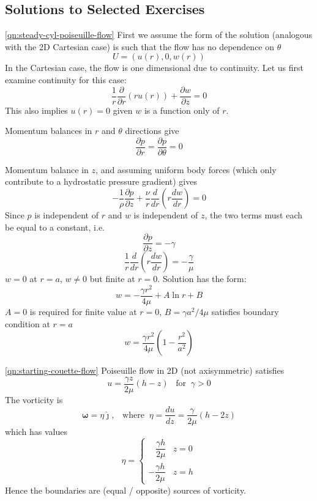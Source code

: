 \documentclass[10pt]{report}
\begin{document}
\begin{answer5}
\newpage
\section{Solutions to Selected Exercises}

\begin{questionnumber}{\ref{qn:steady-cyl-poiseuille-flow}}
	First we assume the form of the solution (analogous with the 2D Cartesian case) is such that the flow has no dependence on $\theta$
	\[
		U = \left( u(r), 0, w(r) \right)
	\]
	In the Cartesian case, the flow is one dimensional due to continuity. Let us first examine
	continuity for this case:
	\[
		\frac{1}{r}\frac{\partial }{\partial r} (r u(r)) + \frac{\partial w}{\partial z} = 0
	\]
	This also implies $u(r) = 0$ given $w$ is a function only of $r$.

	Momentum balances in $r$ and $\theta$ directions give
	\[
		\frac{\partial p}{\partial r} = \frac{\partial p}{\partial \theta} = 0
	\]

	Momentum balance in $z$, and assuming uniform body forces (which only contribute to a hydrostatic pressure gradient) gives
	\[
		-\frac{1}{\rho}\frac{\partial p}{\partial z} +
		\frac{\nu}{r} \frac{d}{dr}\left(r\frac{dw}{dr}\right) = 0
	\]
	Since $p$ is independent of $r$ and $w$ is independent of $z$, the two
	terms must each be equal to a constant, i.e.
	\[
		\frac{\partial p}{\partial z} = -\gamma
	\]
	\[
		\frac{1}{r} \frac{d}{dr}\left(r\frac{dw}{dr}\right) = -\frac{\gamma}{\mu}
	\]
	$w=0$ at $r=a$, $w\ne 0$ but finite at $r=0$. Solution has the form:
	\[
		w = -\frac{\gamma r^{2}}{4\mu} + A \ln r + B
	\]
	$A=0$ is required for finite value at $r=0$, $B = \gamma a^{2} / 4\mu$
	satisfies boundary condition at $r=a$
	\[
		w = \frac{\gamma r^{2}}{4\mu} \left( 1-\frac{r^{2}}{a^{2}} \right)
	\]

\end{questionnumber}

\begin{questionnumber}{\ref{qn:starting-couette-flow}}
Poiseuille flow in 2D (not axisymmetric) satisfies
\[
u = \frac{\gamma z}{2\mu} (h-z) \;\;\; \text{for} \;\; \gamma > 0
\]
The vorticity is
\[
{\bm \omega} = \eta \hat{\bm \jmath}, \;\;\; \text{where} \;\;
               \eta = \frac{du}{dz} = \frac{\gamma}{2\mu}(h-2z)
\]
which has values
\[
	\eta = \begin{cases}
 		\;\;\; \dfrac{\gamma h}{2\mu} & z = 0 \\[2ex]
 		-\dfrac{\gamma h}{2\mu} & z = h
		   \end{cases}
\]
Hence the boundaries are (equal / opposite) sources of vorticity.


\end{questionnumber}
\end{answer5}
\end{document}

